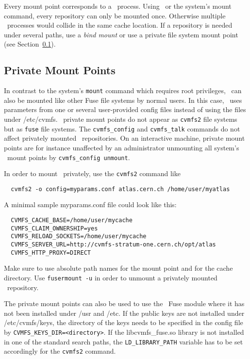Every mount point corresponds to a \cvmfs\ process.
Using \autofs\ or the system's mount command, every repository can only be mounted once.
Otherwise multiple \cvmfs\ processes would collide in the same cache location.
If a repository is needed under several paths, use a \emph{bind mount} or use a private file system mount point (see Section~\ref{sct:privatemount}).

\subsection{Private Mount Points}
\label{sct:privatemount}
In contrast to the system's \texttt{mount} command which requires root privileges, \cvmfs\ can also be mounted like other Fuse file systems by normal users.
In this case, \cvmfs\ uses parameters from one or several user-provided config files instead of using the files under /etc/cvmfs.
\cvmfs\ private mount points do not appear as \texttt{cvmfs2} file systems but as \texttt{fuse} file systems.
The \texttt{cvmfs\_config} and \texttt{cvmfs\_talk} commands do not affect privately mounted \cvmfs\ repositories.
On an interactive machine, private mount points are for instance unaffected by an administrator unmounting all system's \cvmfs\ mount points by \texttt{cvmfs\_config unmount}.

In order to mount \cvmfs\ privately, use the \texttt{cvmfs2} command like
\begin{verbatim}
  cvmfs2 -o config=myparams.conf atlas.cern.ch /home/user/myatlas
\end{verbatim}
A minimal sample myparams.conf file could look like this:
\begin{verbatim}
  CVMFS_CACHE_BASE=/home/user/mycache
  CVMFS_CLAIM_OWNERSHIP=yes
  CVMFS_RELOAD_SOCKETS=/home/user/mycache
  CVMFS_SERVER_URL=http://cvmfs-stratum-one.cern.ch/opt/atlas
  CVMFS_HTTP_PROXY=DIRECT
\end{verbatim}

Make sure to use absolute path names for the mount point and for the cache directory.
Use \texttt{fusermount -u} in order to unmount a privately mounted \cvmfs\ repository.

The private mount points can also be used to use the \cvmfs\ Fuse module where it has not been installed under /usr and /etc.
If the public keys are not installed under /etc/cvmfs/keys, the directory of the keys needs to be specified in the config file by \texttt{CVMFS\_KEYS\_DIR=<directory>}.
If the libcvmfs\_fuse.so library is not installed in one of the standard search paths, the \texttt{LD\_LIBRARY\_PATH} variable has to be set accordingly for the \texttt{cvmfs2} command.

